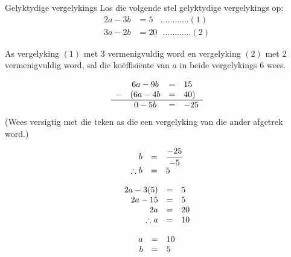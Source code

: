 \begin{wex}
{Gelyktydige vergelykings}
{
Los die volgende stel gelyktydige vergelykings op:
\begin{align*}
  2a - 3b &= 5 ~~~~\ldots \ldots \ldots \ldots (1) \\
  3a-2b &= 20 ~~~\ldots \ldots \ldots \ldots (2)
\end{align*}
}
{
As vergelyking $(1)$ met $3$ vermenigvuldig word en vergelyking $(2)$ met $2$ vermenigvuldig word, sal die ko\"effisi\"ente van $a$ in beide vergelykings $6$ wees.

\begin{equation*}
\begin{array}{cccc}\hfill & 6a-9b& =& 15\hfill \\ 
\hfill- & (6a-4b& =& 40)\hfill \\ \hline
 \hfill & 0 - 5b &=& -25 

\end{array}
\end{equation*}
(Wees versigtig met die teken as die een vergelyking van die ander afgetrek word.)

\begin{equation*}
    \begin{array}{ccl}
 \hfill b &=& \dfrac{-25}{-5} \\
 \hfill \therefore b &=& 5
    \end{array}
\end{equation*}

\begin{equation*}
    \begin{array}{ccl}\hfill 2a - 3(5)&=& 5\\
	\hfill 2a-15 & =& 5\\
	\hfill 2a & =& 20\\
	\hfill \therefore a & =& 10 
   \end{array}
\end{equation*}


\begin{equation*}
\begin{array}{ccc}
 \hfill a& =& 10\hfill \\
\hfill b& =& 5\hfill 
\end{array}
\end{equation*}
}
\end{wex}


